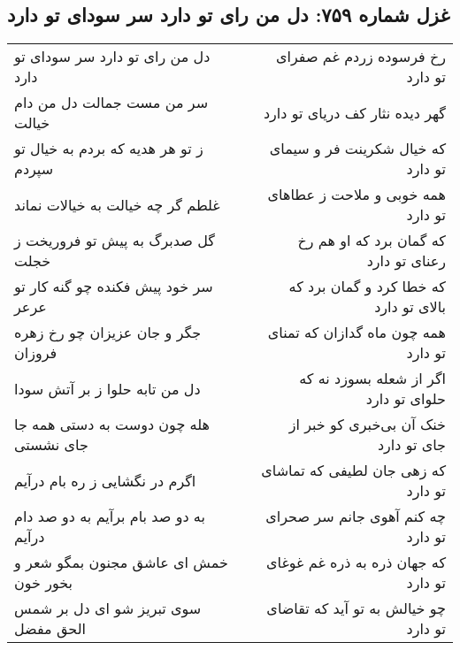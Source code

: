 \begin{center}
\section*{غزل شماره ۷۵۹: دل من رای تو دارد سر سودای تو دارد}
\label{sec:0759}
\begin{longtable}{l p{0.5cm} r}
دل من رای تو دارد سر سودای تو دارد
&&
رخ فرسوده زردم غم صفرای تو دارد
\\
سر من مست جمالت دل من دام خیالت
&&
گهر دیده نثار کف دریای تو دارد
\\
ز تو هر هدیه که بردم به خیال تو سپردم
&&
که خیال شکرینت فر و سیمای تو دارد
\\
غلطم گر چه خیالت به خیالات نماند
&&
همه خوبی و ملاحت ز عطاهای تو دارد
\\
گل صدبرگ به پیش تو فروریخت ز خجلت
&&
که گمان برد که او هم رخ رعنای تو دارد
\\
سر خود پیش فکنده چو گنه کار تو عرعر
&&
که خطا کرد و گمان برد که بالای تو دارد
\\
جگر و جان عزیزان چو رخ زهره فروزان
&&
همه چون ماه گدازان که تمنای تو دارد
\\
دل من تابه حلوا ز بر آتش سودا
&&
اگر از شعله بسوزد نه که حلوای تو دارد
\\
هله چون دوست به دستی همه جا جای نشستی
&&
خنک آن بی‌خبری کو خبر از جای تو دارد
\\
اگرم در نگشایی ز ره بام درآیم
&&
که زهی جان لطیفی که تماشای تو دارد
\\
به دو صد بام برآیم به دو صد دام درآیم
&&
چه کنم آهوی جانم سر صحرای تو دارد
\\
خمش ای عاشق مجنون بمگو شعر و بخور خون
&&
که جهان ذره به ذره غم غوغای تو دارد
\\
سوی تبریز شو ای دل بر شمس الحق مفضل
&&
چو خیالش به تو آید که تقاضای تو دارد
\\
\end{longtable}
\end{center}
